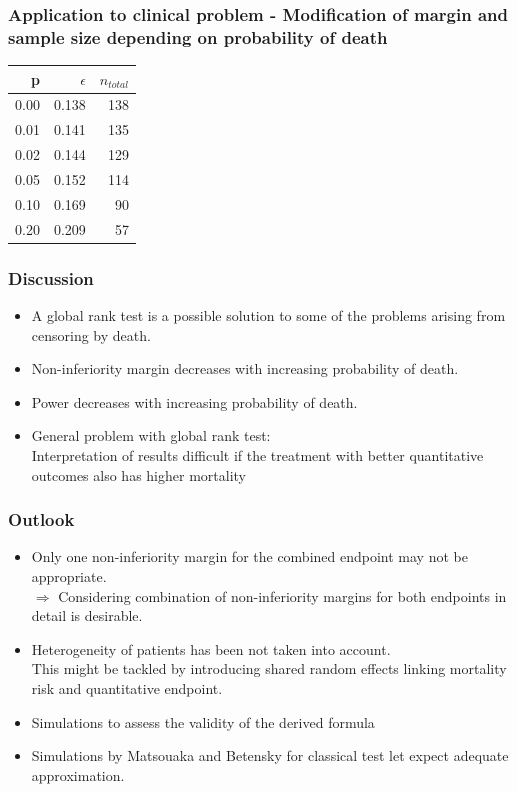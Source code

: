 \documentclass[xcolor=pdftex,dvipsnames,table]{beamer}\usepackage[]{graphicx}\usepackage[]{color}
\begin{document}
\begin{frame}[label = slide13,fragile] %
\frametitle{Application to clinical problem - Modification of margin and sample size depending on probability of death}

\begin{table}[ht]
\centering
\begin{tabular}{rrr}
  \hline
p & $\epsilon$ & $n_{total}$ \\ 
  \hline
0.00 & 0.138 & 138 \\ 
  0.01 & 0.141 & 135 \\ 
  0.02 & 0.144 & 129 \\ 
  0.05 & 0.152 & 114 \\ 
  0.10 & 0.169 & 90 \\ 
  0.20 & 0.209 & 57 \\ 
   \hline
\end{tabular}
\end{table}

\end{frame}

\begin{frame}[label = slide14] %
\frametitle{Discussion}
\begin{itemize}
\item A global rank test is a possible solution to some of the problems arising from censoring by death.
\item Non-inferiority margin decreases with increasing probability of death.
\item Power decreases with increasing probability of death.
\item General problem with global rank test: \\
      Interpretation of results difficult if the treatment with better quantitative outcomes also has higher mortality \\
\end{itemize}
\end{frame}

\begin{frame}[label = slide15] %
\frametitle{Outlook}
\begin{itemize}
\item Only one non-inferiority margin for the combined endpoint may not be appropriate. \\
$\Rightarrow$  Considering combination of non-inferiority margins for both endpoints in detail is desirable.
\item Heterogeneity of patients has been not taken into account. \\
      This might be tackled by introducing shared random effects linking mortality risk and quantitative endpoint.
\item Simulations to assess the validity of the derived formula
\item Simulations by Matsouaka and Betensky for classical test let expect adequate approximation.
\end{itemize}
\end{frame}
\end{document}
